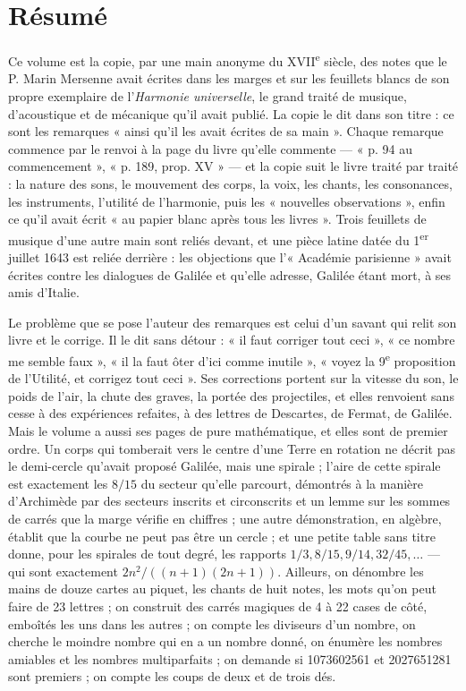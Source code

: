 \documentclass[11pt,a4paper]{article}
\begin{document}
\section*{Résumé}

\begin{resume}
Ce volume est la copie, par une main anonyme du XVII\textsuperscript{e}
siècle, des notes que le P. Marin Mersenne avait écrites dans les marges et sur
les feuillets blancs de son propre exemplaire de l'\emph{Harmonie universelle},
le grand traité de musique, d'acoustique et de mécanique qu'il avait publié. La
copie le dit dans son titre : ce sont les remarques « ainsi qu'il les avait
écrites de sa main ». Chaque remarque commence par le renvoi à la page du livre
qu'elle commente — « p. 94 au commencement », « p. 189, prop. XV » — et la copie
suit le livre traité par traité : la nature des sons, le mouvement des corps,
la voix, les chants, les consonances, les instruments, l'utilité de
l'harmonie, puis les « nouvelles observations », enfin ce qu'il avait écrit
« au papier blanc après tous les livres ». Trois feuillets de musique d'une
autre main sont reliés devant, et une pièce latine datée du 1\textsuperscript{er}
juillet 1643 est reliée derrière : les objections que l'« Académie parisienne »
avait écrites contre les dialogues de Galilée et qu'elle adresse, Galilée étant
mort, à ses amis d'Italie.

Le problème que se pose l'auteur des remarques est celui d'un savant qui relit
son livre et le corrige. Il le dit sans détour : « il faut corriger tout ceci »,
« ce nombre me semble faux », « il la faut ôter d'ici comme inutile », « voyez
la 9\textsuperscript{e} proposition de l'Utilité, et corrigez tout ceci ». Ses
corrections portent sur la vitesse du son, le poids de l'air, la chute des
graves, la portée des projectiles, et elles renvoient sans cesse à des
expériences refaites, à des lettres de Descartes, de Fermat, de Galilée. Mais
le volume a aussi ses pages de pure mathématique, et elles sont de premier
ordre. Un corps qui tomberait vers le centre d'une Terre en rotation ne décrit
pas le demi-cercle qu'avait proposé Galilée, mais une spirale ; l'aire de cette
spirale est exactement les $8/15$ du secteur qu'elle parcourt, démontrés à la
manière d'Archimède par des secteurs inscrits et circonscrits et un lemme sur
les sommes de carrés que la marge vérifie en chiffres ; une autre démonstration,
en algèbre, établit que la courbe ne peut pas être un cercle ; et une petite
table sans titre donne, pour les spirales de tout degré, les rapports
$1/3, 8/15, 9/14, 32/45, \dots$ — qui sont exactement $2n^2/((n+1)(2n+1))$.
Ailleurs, on dénombre les mains de douze cartes au piquet, les chants de huit
notes, les mots qu'on peut faire de 23 lettres ; on construit des carrés
magiques de 4 à 22 cases de côté, emboîtés les uns dans les autres ; on
compte les diviseurs d'un nombre, on cherche le moindre nombre qui en a un
nombre donné, on énumère les nombres amiables et les nombres multiparfaits ; on
demande si 1073602561 et 2027651281 sont premiers ; on compte les coups de
deux et de trois dés.


\end{resume}
\end{document}
